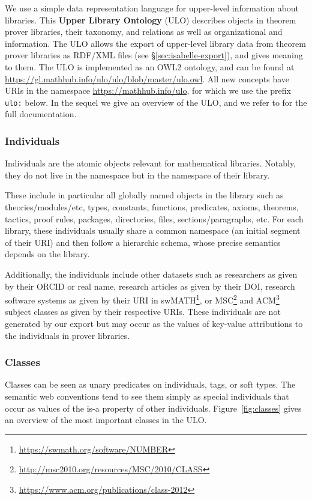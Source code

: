 We use a simple data representation language for upper-level information about libraries. This \textbf{Upper Library Ontology} (ULO) describes objects in theorem prover libraries, their taxonomy, and relations as well as organizational and information.
The ULO allows the export of upper-level library data from theorem prover libraries as RDF/XML files (see \S\ref{sec:isabelle-export}), and gives meaning to them. 
The ULO is implemented as an OWL2 ontology, and can be found at \url{https://gl.mathhub.info/ulo/ulo/blob/master/ulo.owl}.
All new concepts have URIs in the namespace \url{https://mathhub.info/ulo}, for which we use the prefix \lstinline|ulo:| below.
In the sequel we give an overview of the ULO, and we refer to \cite{ULODoc:on} for the full documentation.

\subsubsection{Individuals}

Individuals are the atomic objects relevant for mathematical libraries.
Notably, they do not live in the {\ns} namespace but in the namespace of their library.

These include in particular all globally named objects in the library such as theories/modules/etc, types, constants, functions, predicates, axioms, theorems, tactics, proof rules, packages, directories, files, sections/paragraphs, etc.
For each library, these individuals usually share a common namespace (an initial segment of their URI) and then follow a hierarchic schema, whose precise semantics depends on the library.

Additionally, the individuals include other datasets such as
researchers as given by their ORCID or real name, 
research articles as given by their DOI,
research software systems as given by their URI in swMATH\footnote{\url{https://swmath.org/software/NUMBER}}, 
or MSC\footnote{\url{http://msc2010.org/resources/MSC/2010/CLASS}} and ACM\footnote{\url{https://www.acm.org/publications/class-2012}} subject classes as given by their respective URIs.
These individuals are not generated by our export but may occur as the values of key-value attributions to the individuals in prover libraries.

\subsubsection{Classes}

Classes can be seen as unary predicates on individuals, tags, or soft types.
The semantic web conventions tend to see them simply as special individuals that occur as values of the is-a property of other individuals.
Figure~\ref{fig:classes} gives an overview of the most important classes in the ULO.

